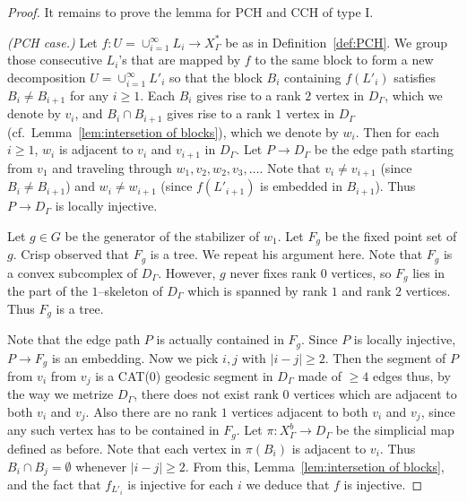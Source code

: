 \documentclass[11pt]{amsart}
\theoremstyle{definition}
\newcommand{\Xa}{X^{\ast}}
\begin{document}
\begin{proof}
It remains to prove the lemma for PCH and CCH of type I.
\medskip

\noindent	
\emph{(PCH case.) }Let $f\colon U=\cup_{i=1}^{\infty}L_i\to \Xa_\Gamma$ be as in Definition~\ref{def:PCH}. We group those consecutive $L_i$'s that are mapped by $f$ to the same block to form a new decomposition $U=\cup_{i=1}^{\infty} L'_i$ so that the block $B_i$ containing $f(L'_i)$ satisfies $B_i\neq B_{i+1}$ for any $i\ge 1$. Each $B_i$ gives rise to a rank $2$ vertex in $D_\Gamma$, which we denote by $v_i$, and $B_i\cap B_{i+1}$ gives rise to a rank $1$ vertex in $D_\Gamma$ (cf.\ Lemma~\ref{lem:intersetion of blocks}), which we denote by $w_i$. Then for each $i\ge 1$, $w_i$ is adjacent to $v_i$ and $v_{i+1}$ in $D_\Gamma$. Let $P\to  D_\Gamma$ be the edge path starting from $v_1$ and traveling through $w_1,v_2,w_2,v_3,\ldots$. Note that $v_i\neq v_{i+1}$ (since $B_i\neq B_{i+1}$) and $w_i\neq w_{i+1}$ (since $f(L'_{i+1})$ is embedded in $B_{i+1}$). Thus $P\to D_\Gamma$ is locally injective. 

Let $g\in G$ be the generator of the stabilizer of $w_1$. Let $F_g$ be the fixed point set of $g$. Crisp \cite{MR2174269} observed that $F_g$ is a tree. We repeat his argument here. Note that $F_g$ is a convex subcomplex of $D_\Gamma$. However, $g$ never fixes rank $0$ vertices, so $F_g$ lies in the part of the $1$--skeleton of $D_\Gamma$ which is spanned by rank $1$ and rank $2$ vertices. Thus $F_g$ is a tree. 

Note that the edge path $P$ is actually contained in $F_g$. Since $P$ is locally injective, $P\to F_g$ is an embedding. Now we pick $i,j$ with $|i-j|\ge 2$. Then the segment of $P$ from $v_i$ from $v_j$ is a CAT(0) geodesic segment in $D_\Gamma$ made of $\ge 4$ edges thus, by the way we metrize $D_\Gamma$, there does not exist rank $0$ vertices which are adjacent to both $v_i$ and $v_j$. Also there are no rank $1$ vertices adjacent to both $v_i$ and $v_j$, since any such vertex has to be contained in $F_g$. Let $\pi\colon X^b_\Gamma\to D_\Gamma$ be the simplicial map defined as before. Note that each vertex in $\pi(B_i)$ is adjacent to $v_i$. Thus $B_i\cap B_j=\emptyset$ whenever $|i-j|\ge 2$. From this, Lemma~\ref{lem:intersetion of blocks}, and the fact that $f_{L'_i}$ is injective for each $i$ we deduce that $f$ is injective.
\medskip


\end{proof}
\end{document}
